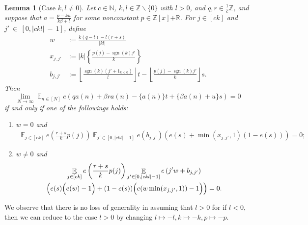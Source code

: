 \documentclass[11pt]{amsart}
\newtheorem{lemma}{Lemma}[section]
\theoremstyle{definition}
\DeclareMathOperator*{\E}{\mathbb{E}}
\newcommand{\N}{{\mathbb N}}
\newcommand{\R}{{\mathbb R}}
\newcommand{\Z}{{\mathbb Z}}
\newcommand{\1}{{\mathbf{1}}}
\DeclareMathOperator{\sgn}{sgn}
\newcommand{\brac}[1]{\mathopen{}\left( #1 \mathclose{}\right)}
\newcommand{\Bigbrac}[1]{\Bigl( #1 \Bigr)}
\newcommand{\floor}[1]{{\left \lfloor #1 \right \rfloor}}
\newcommand{\rem}[1]{\left \{ #1 \right \}}
\begin{document}
\begin{lemma}[Case $k,l\neq 0$]\label{L: (k beta + l) a  = p + g}
Let $c\in\N$, $k, l\in\Z\backslash\{0\}$ {with $l>0$}, and $q,r\in\frac{1}{c}\Z$, and suppose that $a = \frac{p-ku}{k\beta + l}$ for some nonconstant $p\in\Z[x]{+\R}$. For $j\in[ck]$ and $j'~\in~[0,|ckl|~-~1]$, define
\begin{align*}
  w &:= {\frac{k(q-t)-l(r+s)}{|kl|}}\\
  x_{j,j'} &:= |k|\rem{\frac{p(j)-\sgn(k)j'}{k}}\\
  b_{j, j'} &:=\floor{\frac{\sgn(k)(j' +1_{k<0})}{l}}t-\floor{\frac{p(j)-\sgn(k)j'}{k}}s. 
\end{align*}
Then
\begin{equation*}
    \lim_{N\to\infty}\E_{n\in[N]} e(qa(n)+\beta r a(n)-\{ a(n)\}t +\{\beta a(n)+u\}s) = 0
\end{equation*}
 if and only if one of the followings holds: 
      \begin{enumerate}
    \item $w=0$ and 
    \begin{align*}
    \E_{j\in[ck]}e\left(\frac{{r+s}}{k}p(j)\right)\E_{j'\in[0, |ckl|-1]}e\left(b_{j,j'}\right)(e(s) + \min(x_{j,j'},1)(1-e(s))) = 0;
\end{align*}
    \item $w\neq 0$ and 
\begin{multline*}
\E_{j\in[ck]}e\left(\frac{{r+s}}{k}p(j)\right)\E_{j'\in[0, |ckl|-1]}e\left({j'w}+b_{j,j'}\right)\\
    \brac{e(s)\Bigbrac{e({w})-1}+(1-e(s))\Bigbrac{e({w\min(x_{j,j'},1)})-1}} = 0.
\end{multline*}    
\end{enumerate}
\end{lemma}
{We observe that there is no loss of generality in assuming that $l>0$ for if $l<0$, then we can reduce to the case $l>0$ by changing $l\mapsto -l, k\mapsto -k, p\mapsto -p$.} 
\end{document}
